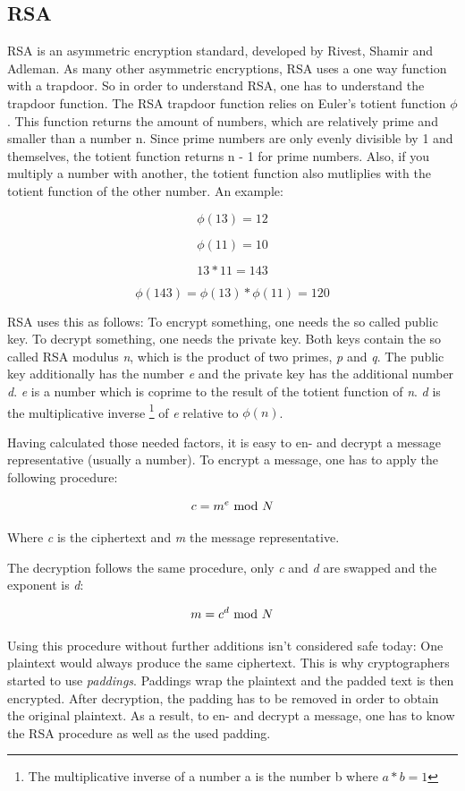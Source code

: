 \subsection{RSA}
	
RSA is an asymmetric encryption standard, developed by Rivest, Shamir and
Adleman. As many other asymmetric encryptions, RSA uses a one way function
with a trapdoor. So in order to understand RSA, one has to understand the
trapdoor function. The RSA trapdoor function relies on Euler's totient function
$\phi$. This function returns the amount of numbers, which are relatively prime
and smaller than a number n. Since prime numbers are only evenly divisible by
1 and themselves, the totient function returns n - 1 for prime numbers. Also,
if you multiply a number with another, the totient function also mutliplies
with the totient function of the other number. An example:

$$\phi(13) = 12$$

$$\phi(11) = 10$$

$$13 * 11 = 143$$

$$\phi(143) = \phi(13) * \phi(11) = 120$$

RSA uses this as follows: To encrypt something, one needs the so called
public key. To decrypt something, one needs the private key. Both keys
contain the so called RSA modulus \textit{n}, which is the product of 
two primes, \textit{p} and \textit{q}. The public key additionally has
the number \textit{e} and the private key has the additional number
\textit{d}. \textit{e} is a number which is coprime to the result of
the totient function of \textit{n}. \textit{d} is the multiplicative inverse
\footnote{The multiplicative inverse of a number a is the number b where $a*b = 1$} of
\textit{e} relative to $\phi(n)$.

Having calculated those needed factors, it is easy to en- and decrypt
a message representative (usually a number). To encrypt a message, one
has to apply the following procedure:

$$c = m^e \ \text{mod}\ N$$

Where \textit{c} is the ciphertext and \textit{m} the message representative.

The decryption follows the same procedure, only \textit{c} and \textit{d} are
swapped and the exponent is \textit{d}:

$$m = c^d \ \text{mod}\ N$$

Using this procedure without further additions isn't considered safe today:
One plaintext would always produce the same ciphertext. This is why cryptographers
started to use \textit{paddings}. Paddings wrap the plaintext and the padded
text is then encrypted. After decryption, the padding has to be removed in order
to obtain the original plaintext. As a result, to en- and decrypt a message, one
has to know the RSA procedure as well as the used padding.

